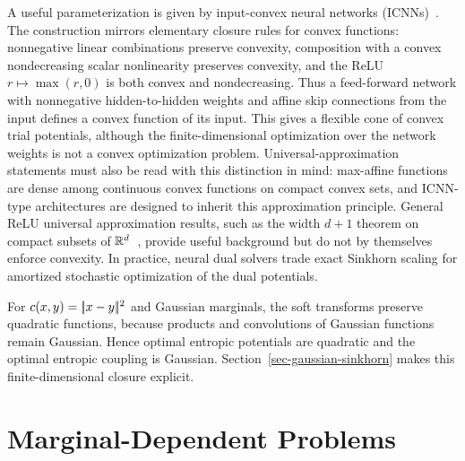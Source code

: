 A useful parameterization is given by input-convex neural networks (ICNNs)~\cite{amos2017input,makkuva2020optimal}. The construction mirrors elementary closure rules for convex functions: nonnegative linear combinations preserve convexity, composition with a convex nondecreasing scalar nonlinearity preserves convexity, and the ReLU \(r\mapsto\max(r,0)\) is both convex and nondecreasing. Thus a feed-forward network with nonnegative hidden-to-hidden weights and affine skip connections from the input defines a convex function of its input. This gives a flexible cone of convex trial potentials, although the finite-dimensional optimization over the network weights is not a convex optimization problem. Universal-approximation statements must also be read with this distinction in mind: max-affine functions are dense among continuous convex functions on compact convex sets, and ICNN-type architectures are designed to inherit this approximation principle. General ReLU universal approximation results, such as the width \(d+1\) theorem on compact subsets of \(\mathbb{R}^d\)~\cite{hanin2019universal}, provide useful background but do not by themselves enforce convexity. In practice, neural dual solvers trade exact Sinkhorn scaling for amortized stochastic optimization of the dual potentials.

\begin{rem}\label{rem-sinkhorn-gaussian-marginals}
	For $c(x,y)=|\!| x-y |\!|^2$ and Gaussian marginals, the soft transforms preserve quadratic functions, because products and convolutions of Gaussian functions remain Gaussian. Hence optimal entropic potentials are quadratic and the optimal entropic coupling is Gaussian. Section~\ref{sec-gaussian-sinkhorn} makes this finite-dimensional closure explicit.
\end{rem}


\section{Marginal-Dependent Problems}
\label{sec-sinkhorn-marginal-dependent}

